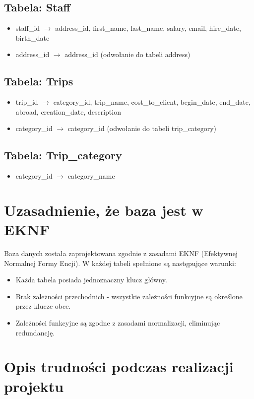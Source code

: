 \documentclass{article}
\begin{document}
\subsection{Tabela: Staff}
\begin{itemize}
    \item staff\_id $\rightarrow$ address\_id, first\_name, last\_name, salary, email, hire\_date, birth\_date
    \item address\_id $\rightarrow$ address\_id (odwołanie do tabeli address)
\end{itemize}
\subsection{Tabela: Trips}
\begin{itemize}
    \item trip\_id $\rightarrow$ category\_id, trip\_name, cost\_to\_client, begin\_date, end\_date, abroad, creation\_date, description
    \item category\_id $\rightarrow$ category\_id (odwołanie do tabeli trip\_category)
\end{itemize}
\subsection{Tabela: Trip\_category}
\begin{itemize}
    \item category\_id $\rightarrow$ category\_name
\end{itemize}

\newpage

\section{Uzasadnienie, że baza jest w EKNF}
Baza danych została zaprojektowana zgodnie z zasadami EKNF (Efektywnej Normalnej Formy Encji). W każdej tabeli spełnione są następujące warunki:
\begin{itemize}
    \item Każda tabela posiada jednoznaczny klucz główny.
    \item Brak zależności przechodnich - wszystkie zależności funkcyjne są określone przez klucze obce.
    \item Zależności funkcyjne są zgodne z zasadami normalizacji, eliminując redundancję.
\end{itemize}

\section{Opis trudności podczas realizacji projektu}
\end{document}
